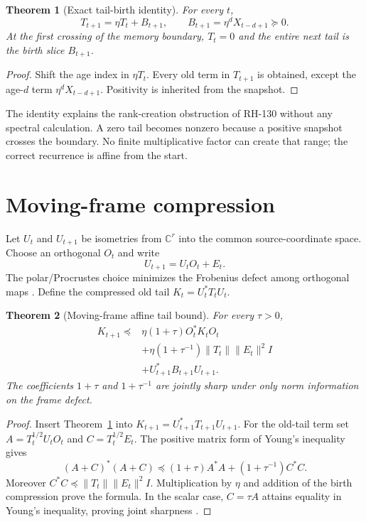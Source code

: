 \documentclass[12pt]{article}
\newtheorem{theorem}{Theorem}
\begin{document}
\begin{theorem}[Exact tail-birth identity]\label{thm:birth}
For every $t$,
\[
 T_{t+1}=\eta T_t+B_{t+1},\qquad
 B_{t+1}=\eta^dX_{t-d+1}\succeq0.
\]
At the first crossing of the memory boundary, $T_t=0$ and the entire next
tail is the birth slice $B_{t+1}$.
\end{theorem}
\begin{proof}
Shift the age index in $\eta T_t$.  Every old term in $T_{t+1}$ is obtained,
except the age-$d$ term $\eta^dX_{t-d+1}$.  Positivity is inherited from the
snapshot.
\end{proof}

The identity explains the rank-creation obstruction of RH-130 without any
spectral calculation.  A zero tail becomes nonzero because a positive
snapshot crosses the boundary.  No finite multiplicative factor can create
that range; the correct recurrence is affine from the start.

\section{Moving-frame compression}
Let $U_t$ and $U_{t+1}$ be isometries from $\mathbb C^r$ into the common
source-coordinate space.  Choose an orthogonal $O_t$ and write
\[
 U_{t+1}=U_tO_t+E_t.
\]
The polar/Procrustes choice minimizes the Frobenius defect among orthogonal
maps \citep{GolubVanLoan2013}.  Define the compressed old tail
$K_t=U_t^*T_tU_t$.

\begin{theorem}[Moving-frame affine tail bound]\label{thm:moving}
For every $\tau>0$,
\begin{align*}
 K_{t+1}\preceq{}&\eta(1+\tau)O_t^*K_tO_t\\
 &+\eta(1+\tau^{-1})\|T_t\|\|E_t\|^2I\\
 &+U_{t+1}^*B_{t+1}U_{t+1}.
\end{align*}
The coefficients $1+\tau$ and $1+\tau^{-1}$ are jointly sharp under only
norm information on the frame defect.
\end{theorem}

\begin{proof}
Insert Theorem~\ref{thm:birth} into
$K_{t+1}=U_{t+1}^*T_{t+1}U_{t+1}$.  For the old-tail term set
$A=T_t^{1/2}U_tO_t$ and $C=T_t^{1/2}E_t$.  The positive matrix form of
Young's inequality gives
\[
 (A+C)^*(A+C)\preceq(1+\tau)A^*A+(1+\tau^{-1})C^*C.
\]
Moreover $C^*C\preceq\|T_t\|\|E_t\|^2I$.  Multiplication by $\eta$ and
addition of the birth compression prove the formula.  In the scalar case,
$C=\tau A$ attains equality in Young's inequality, proving joint sharpness
\citep{Bhatia1997}.
\end{proof}
\end{document}
